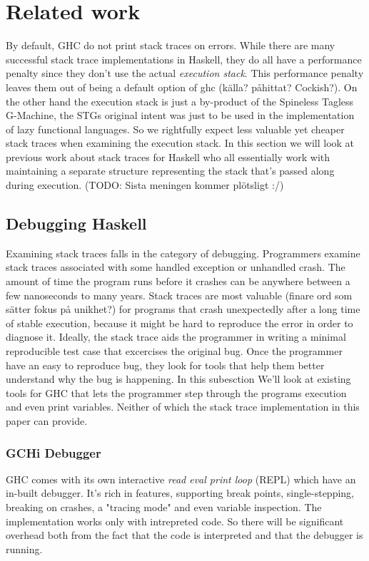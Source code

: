 \chapter{Related work}

By default, GHC do not print stack traces on errors. While there are many
successful stack trace implementations in Haskell, they do all have a
performance penalty since they don't use the actual \emph{execution stack}.
This performance penalty leaves them out of being a default option of ghc
(källa?  påhittat? Cockish?).  On the other hand the execution stack is just a
by-product of the Spineless Tagless G-Machine, the STGs original intent was
just to be used in the implementation of lazy functional languages.  So we
rightfully expect less valuable yet cheaper stack traces when examining the
execution stack.  In this section we will look at previous work about stack
traces for Haskell who all essentially work with maintaining a separate
structure representing the stack that's passed along during execution.
(TODO: Sista meningen kommer plötsligt :/)

\section{Debugging Haskell}

Examining stack traces falls in the category of debugging. Programmers examine
stack traces associated with some handled exception or unhandled crash. The
amount of time the program runs before it crashes can be anywhere between a few
nanoseconds to many years. Stack traces are most valuable (finare ord som
sätter fokus på unikhet?) for programs that crash unexpectedly after a long
time of stable execution, because it might be hard to reproduce the error in
order to diagnose it. Ideally, the stack trace aids the programmer in writing a
minimal reproducible test case that excercises the original bug.  Once
the programmer have an easy to reproduce bug, they look for tools that help them
better understand why the bug is happening.  In this subesction We'll look at
existing tools for GHC that lets the programmer step through the programs
execution and even print variables. Neither of which the stack trace
implementation in this paper can provide.

\subsection{GCHi Debugger}

GHC comes with its own interactive \emph{read eval print loop} (REPL)
which have an in-built debugger. It's rich in features, supporting break
points, single-stepping, breaking on crashes, a "tracing mode" and even
variable inspection. The implementation works only with intrepreted
code. \cite{ghci_debugger} So there will be significant overhead both
from the fact that the code is interpreted and that the debugger is
running.


